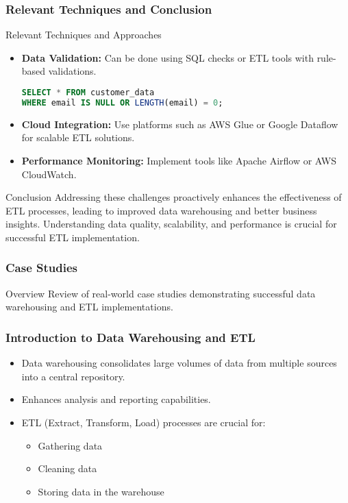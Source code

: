 \documentclass{beamer}
\begin{document}
\begin{frame}[fragile]
    \frametitle{Relevant Techniques and Conclusion}
    \begin{block}{Relevant Techniques and Approaches}
        \begin{itemize}
            \item \textbf{Data Validation:} Can be done using SQL checks or ETL tools with rule-based validations.
            \begin{lstlisting}[language=SQL]
SELECT * FROM customer_data
WHERE email IS NULL OR LENGTH(email) = 0;
            \end{lstlisting}
            \item \textbf{Cloud Integration:} Use platforms such as AWS Glue or Google Dataflow for scalable ETL solutions.
            \item \textbf{Performance Monitoring:} Implement tools like Apache Airflow or AWS CloudWatch.
        \end{itemize}
    \end{block}
    
    \begin{block}{Conclusion}
        Addressing these challenges proactively enhances the effectiveness of ETL processes, leading to improved data warehousing and better business insights. Understanding data quality, scalability, and performance is crucial for successful ETL implementation.
    \end{block}
\end{frame}

\begin{frame}[fragile]
    \frametitle{Case Studies}
    \begin{block}{Overview}
        Review of real-world case studies demonstrating successful data warehousing and ETL implementations.
    \end{block}
\end{frame}

\begin{frame}[fragile]
    \frametitle{Introduction to Data Warehousing and ETL}
    \begin{itemize}
        \item Data warehousing consolidates large volumes of data from multiple sources into a central repository.
        \item Enhances analysis and reporting capabilities.
        \item ETL (Extract, Transform, Load) processes are crucial for:
        \begin{itemize}
            \item Gathering data
            \item Cleaning data
            \item Storing data in the warehouse
        \end{itemize}
    \end{itemize}
\end{frame}
\end{document}
